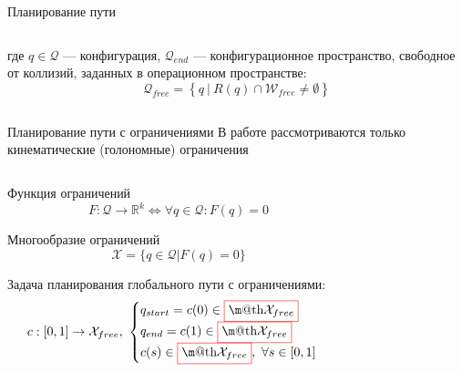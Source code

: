 \documentclass[11pt, aspectratio=169]{beamer}
\makeatletter
\newcommand{\colorboxed}[3][white]{\fcolorbox{#2}{#1}{\m@th$\displaystyle#3$}}
\makeatother
\begin{document}
\begin{frame}{Планирование пути}
\begin{columns}[onlytextwidth]
\begin{column}{0.60\textwidth}
\begin{equation}
            \end{equation}
            где $q \in \mathcal{Q}$ --- конфигурация, $\mathcal{Q}_{end}$ --- конфигурационное пространство, свободное от коллизий, заданных в операционном пространстве:
            \begin{equation}
                \mathcal{Q}_{free} = \left\{q\ |\ R(q) \cap \mathcal{W}_{free} \neq \emptyset\right\}
            \end{equation}
        \end{column}
    \end{columns}
\end{frame}

\begin{frame}{Планирование пути с ограничениями}
    В работе рассмотриваются только кинематические (голономные) ограничения
    \begin{columns}[onlytextwidth]
        \begin{column}{0.62\textwidth}
            \begin{alertblock}{Функция ограничений}
                \begin{equation}
                    \nonumber F : \mathcal{Q} \rightarrow \mathbb{R}^k  \iff \forall q\in \mathcal{Q}: F(q)=0
                \end{equation}
            \end{alertblock}
            \begin{alertblock}{Многообразие ограничений}
                \begin{equation}
                    \nonumber \mathcal{X} =\{q\in \mathcal{Q} | F(q)=0 \}
                \end{equation}
            \end{alertblock}
            Задача планирования глобального пути с ограничениями:
            \begin{equation}
                c : [0, 1] \rightarrow \mathcal{X}_{free},\   \begin{cases}q_{start} = c(0) \in \colorboxed{red}{\mathcal{X}_{free}}\\ q_{end} = c(1) \in \colorboxed{red}{\mathcal{X}_{free}} \\  c(s)\in \colorboxed{red}{\mathcal{X}_{free}},\ \forall s\in[0, 1]\end{cases}
            \end{equation}
        \end{column}
        \begin{column}{0.35\textwidth}
            \begin{figure}

\end{figure}
\end{column}
\end{columns}
\end{frame}
\end{document}
